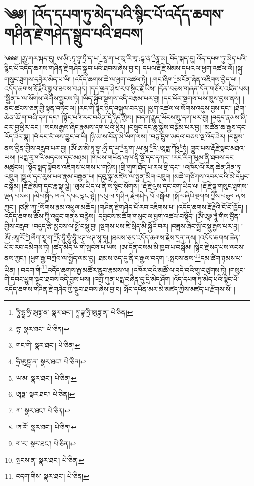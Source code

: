 \setcounter{footnote}{0} 
\chapter{༄༅། །འོད་དཔག་ཏུ་མེད་པའི་སྙིང་པོ་འདོད་ཆགས་གཤིན་རྗེ་གཤེད་སྒྲུབ་པའི་ཐབས།}༄༅༅། །རྒྱ་གར་སྐད་དུ། ཨ་མི་:ཏཱ་བྷཱ་ཧྲྀ་ད་ཡ་\footnote{ཏཱི་བྷཱ་ཧྲི་ཨུཏྟྲ་ན་  སྣར་ཐང་། ཏཱ་བྷ་ཧྲི་ཨུཏྟྲ་ན་  པེ་ཅིན། }རཱ་ག་ཡ་མཱ་རི་སཱ་:དྷ་ནཾ་\footnote{དྷ་  སྣར་ཐང་།  པེ་ཅིན། }ནཱ་མ། བོད་སྐད་དུ། འོད་དཔག་ཏུ་མེད་པའི་སྙིང་པོ་འདོད་ཆགས་གཤིན་རྗེ་གཤེད་སྒྲུབ་པའི་ཐབས་ཞེས་བྱ་བ། དཔལ་རྡོ་རྗེ་སེམས་དཔའ་ལ་ཕྱག་འཚལ་ལོ། །སྐུ་གསུང་ཐུགས་དབྱེར་མེད་པ་ཡི། །འདོད་ཆགས་ཆེ་ལ་ཕྱག་འཚལ་ཏེ། །:གང་ཞིག་\footnote{གང་གི་  སྣར་ཐང་།  པེ་ཅིན། }མངོན་ཞེན་འཇིགས་བྱེད་པ། །འདོད་ཆགས་རྡོ་རྗེའི་སྒྲུབ་ཐབས་བཤད། །དད་ལྡན་ཤེས་རབ་སྙིང་རྗེ་ཡིས། །དོན་བཅས་གཞན་དོན་གཙོར་འཛིན་པས། །སྦྱིན་པ་ལ་སོགས་ལེགས་སྦྱངས་ཏེ། །ཡིད་སྐྱོབ་སྔགས་འདི་བརྩམ་པར་བྱ། །དང་པོར་སྔགས་པས་ཁྲུས་བྱས་ནས། །ནང་ཚངས་ཅན་གྱི་སྟན་བཏིང་ལ། །རང་གི་སྙིང་ཉིད་བསྐུལ་བར་བྱ། །ཕྱག་འཚལ་ལ་སོགས་འདུས་བྱས་དང་། །ཐེག་ཆེན་ཆོ་ག་བཞི་དག་དང་། །སྟོང་པའི་རང་བཞིན་དེ་ཉིད་ཀྱིས། །བདག་རྒྱུད་ཡོངས་སུ་དག་པར་བྱ། །བདུད་རྣམས་ཞི་བར་བྱ་ཕྱིར་དང་། །སངས་རྒྱས་ཞིང་རྣམས་དག་པའི་ཕྱིར། །བསྲུང་དང་ཆུ་སྐྱེས་བསྒོམ་པར་བྱ། །མཚོན་ཆ་རྒྱས་དང་འོད་ཟེར་སྣ། །བཾ་དང་རཾ་ལས་བྱུང་བ་ཡི། །ཉི་མ་ས་བོན་མེ་ཡིག་ལས། །བཅུ་དྲུག་མདའ་བཅས་ལྔ་འོད་ཟེར། །བསྡུས་ནས་བྱིན་གྱིས་བརླབ་པར་བྱ། །ཨོཾ་ཨ་མི་ཏཱ་བྷཱ་:ཧྲྀ་ད་ཡ་\footnote{ཧྲི་ཨུཏྟྲ་ན་  སྣར་ཐང་།  པེ་ཅིན། }རཱ་ག་:ཡ་མཱ་\footnote{ཡ་མ་  སྣར་ཐང་།  པེ་ཅིན། }རི་:ཨཱཏྨ་ཀོ྅\footnote{ཨཱཏྨ་  སྣར་ཐང་།  པེ་ཅིན། }ཧཾ། གྱུར་པས་རྡོ་རྗེ་སྣང་མཐའ་ཡས། །པདྨ་རཱ་གའི་མདངས་དང་མཉམ། །གཡས་གཡོན་ཞལ་ནི་སྔོ་དང་དཀར། །རང་རིག་ཡུམ་ནི་ཐབས་དང་མཚུངས། །སྟོད་སྨད་སྟོབས་འཇིགས་པགས་པ་གཉིས། །གྲི་གུག་ཐོད་པ་རལ་གྲི་དང་། །འཁོར་ལོ་རིན་ཆེན་ཤིན་ཏུ་འཁྲུག །སྦྲུལ་དང་རུས་པས་རྣམ་བརྒྱན་པ། །དབུ་སྐྲ་མཛེས་ལ་སྤྱན་མིག་འཁྲུག །མཆེ་གཙིགས་འབར་བའི་མེ་དཔུང་བསྒོམ། །རྡོ་རྗེ་མིག་དང་རྣ་སྣ་ལྕེ། །ལུས་ཡིད་ལ་ནི་ས་སྙིང་སོགས། །རྡོ་རྗེ་ལུས་དང་ངག་ཡིད་ལ། །རྡོ་རྗེ་སྐུ་གསུང་ཐུགས་ལྡན་བསམ། །མི་བསྐྱོད་ལ་ནི་དབང་བླང་སྟེ། །དབུ་ལ་གཤིན་རྗེ་གཤེད་པོ་བསྒོམ། །སྒོ་བཞིའི་སྔགས་ཀྱིས་བཅུག་ནས་ཀྱང་། །ཙརྩི་ཀཱ་\footnote{ཀ་  སྣར་ཐང་།  པེ་ཅིན། }སོགས་རྣམ་འཕྲུལ་མཆོད། །གཤིན་རྗེ་གཤེད་པོ་རབ་འཇིགས་པ། །འདོད་ཆགས་རྡོ་རྗེའི་ངོ་བོ་ཁྱོད། །འདོད་ཆགས་ཆོས་ཀྱི་འབྱུང་གནས་བརྙེས། །དབྱངས་མཆོག་གསུང་ལ་ཕྱག་འཚལ་བསྟོད། །ཨོཾ་ཨཱཿ་ཧཱུྃ་གིས་བྱིན་གྱིས་བརླབ། །བདུད་རྩི་མྱངས་ལ་སྤྲོ་བསྡུ་བྱ། །སྔགས་པས་ཇི་སྲིད་མི་སྐྱོའི་བར། །བཟླས་ཞིང་སྤྲོ་བསྡུ་རྒྱས་པར་བྱ། །
ཨོཾ་:ཨཱ་རོ་\footnote{ཨ་རོ་  སྣར་ཐང་།  པེ་ཅིན། }lལྀཀ་རཱ་ག་\footnote{ག་ར་  སྣར་ཐང་།  པེ་ཅིན། }ཏི་ཧཱུྃ་ཧཱུྃ་ཧཱུྃ་ཕཊ་ཕཊ་སྭཱ་ཧཱ། །ཐམས་ཅད་འདོད་ཆགས་རྗེས་དྲན་ནས། །འདོད་ཆགས་ཆེན་པོར་རབ་དམིགས་ཏེ། །ཚད་མེད་ཡི་གེ་སྤངས་པ་ཡིས། །ཨ་དོན་བསམ་མི་ཁྱབ་པ་བསྒོམ། །སྙིང་རྗེ་སད་པས་ལངས་ནས་ཀྱང་། །ཕྱག་རྒྱ་བཀྲོལ་ལ་སྤྱོད་ལམ་བྱ། །ཐམས་ཅད་དུ་ནི་ང་རྒྱལ་བདག །:སྤངས་ནས་\footnote{སྤངས་ན་  སྣར་ཐང་།  པེ་ཅིན། }དམ་ཚིག་ཉམས་པ་ཡིན། །:བདག་གི་\footnote{བདག་གིས་  སྣར་ཐང་།  པེ་ཅིན། }འདོད་ཆགས་རྒྱ་མཚོར་ནུབ་རྣམས་ལ། །འཁོར་བའི་མཚོ་ལ་བདེ་བའི་གྲུ་བཙུགས་ཏེ། །གསུང་གི་དབང་ཕྱུག་སྒྲུབ་ཐབས་འདི་བྱས་པས། །འགྲོ་ཀུན་པདྨ་བཞིན་དུ་དྲི་མེད་ཤོག །འོད་དཔག་ཏུ་མེད་པའི་སྙིང་པོ་འདོད་ཆགས་གཤིན་རྗེ་གཤེད་ཀྱི་སྒྲུབ་ཐབས་ཞེས་བྱ་བ། སློབ་དཔོན་མར་མེ་མཛད་ཀྱིས་མཛད་པ་རྫོགས་སོ། ། 